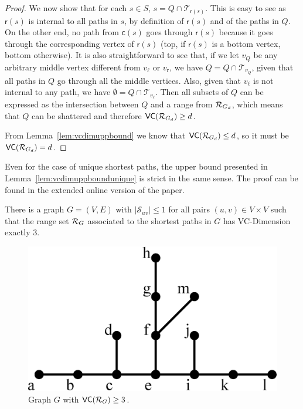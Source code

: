 \begin{proof}
  We now show that for each $s\in S$, $s=Q\cap\mathcal{T}_{\mathsf{r}(s)}$. This
  is easy to see as $\mathsf{r}(s)$ is internal to all paths in $s$, by
  definition of $\mathsf{r}(s)$ and of the paths in $Q$. On the other end, no
  path from $\mathsf{c}(s)$ goes through $\mathsf{r}(s)$ because it goes through
  the corresponding vertex of $\mathsf{r}(s)$ (top, if $\mathsf{r}(s)$ is a
  bottom vertex, bottom otherwise). It is also straightforward to see that,
  if we let $v_Q$ be any arbitrary middle vertex different from $v_\ell$
  or $v_\mathrm{r}$, we have $Q=Q\cap\mathcal{T}_{v_Q}$, given that all paths in
  $Q$ go through all the middle vertices. Also, given that $v_\ell$ is not
  internal to any path, we have $\emptyset=Q\cap\mathcal{T}_{v_\ell}$. Then all
  subsets of $Q$ can be expressed as the intersection between $Q$ and a range
  from $\mathcal{R}_{G_d}$, which means that $Q$ can be shattered and therefore
  $\mathsf{VC}(\mathcal{R}_{G_d})\ge d$.

  From Lemma~\ref{lem:vcdimuppbound} we know that $\mathsf{VC}(\mathcal{R}_{G_d})\le d$, so
  it must be $\mathsf{VC}(\mathcal{R}_{G_d})=d$.
\end{proof}
\fi

Even for the case of unique shortest paths, the upper bound presented in
Lemma~\ref{lem:vcdimuppboundunique} is strict in the same sense.
\ifproof
\else
The proof can be found in the extended online version of the paper.
\fi

\begin{lemma}\label{lem:vcdimlowboundunique}
  There is a graph $G=(V,E)$ with $|\mathcal{S}_{uv}|\le1$ for all
  pairs $(u,v)\in V\times V$ such that the range set $\mathcal{R}_G$ associated to the
  shortest paths in $G$ has VC-Dimension exactly $3$.
\end{lemma}

\ifproof
\begin{figure}[ht]
  \centering
  \includegraphics[scale=0.35]{uniqueshortestpathtight}
  \caption{Graph $G$ with $\mathsf{VC}(\mathcal{R}_G)\ge 3$.}
  \label{fig:uniquetight}
\end{figure}

